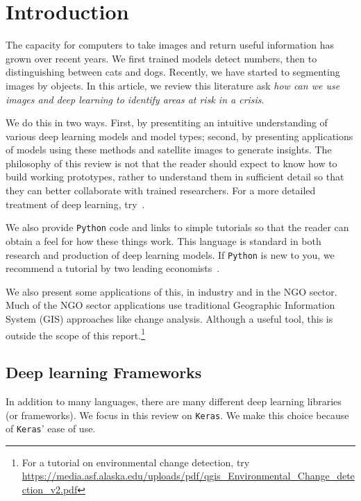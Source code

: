 \documentclass[12pt, a4paper, oneside, headinclude, footinclude]{article}
\begin{document}
\section{Introduction}

The capacity for computers to take images and return useful information has
grown over recent years. We first trained models detect numbers, then to
distinguishing between cats and dogs. Recently, we have started to segmenting
images by objects. In this article, we review this literature ask \textit{how
can we use images and deep learning to identify areas at risk in a crisis}. 

We do this in two ways. First, by presentiting an intuitive understanding of
various deep learning models and model types; second, by presenting
applications of models using these methods and satellite images to generate
insights. The philosophy of this review is not that the reader should expect
to know how to build working prototypes, rather to understand them in
sufficient detail so that they can better collaborate with trained
researchers. For a more detailed treatment of deep learning,
try~\cite{lecun2015deep}.

We also provide \texttt{Python} code and links to simple tutorials so that
the reader can obtain a feel for how these things work. This language is
standard in both research and production of deep learning models. If
\texttt{Python} is new to you, we recommend a tutorial by two leading
economists~\cite{EconomicsIntroduction}.

We also present some applications of this, in industry and in the NGO sector.
Much of the NGO sector applications use traditional Geographic Information
System (GIS) approaches like change analysis. Although a useful tool, this is
outside the scope of this report.\footnote{For a tutorial on environmental
change detection, try
\url{https://media.asf.alaska.edu/uploads/pdf/qgis_Environmental_Change_detection_v2.pdf}}


\subsection{Deep learning Frameworks}

In addition to many languages, there are many different deep learning
libraries (or frameworks). We focus in this review on \texttt{Keras}. We
make this choice because of \texttt{Keras}' ease of use. 
\end{document}
